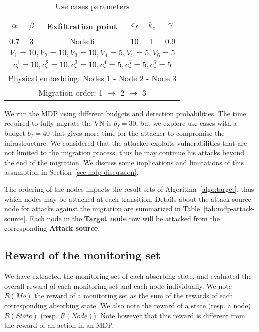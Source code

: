 \begin{table}[ht]
\centering
\begin{tabular}{|c|c|l|c|c|c|c|}
\hline
$\alpha$ & \multicolumn{2}{c|}{$\beta$} & Exfiltration point & $c_f$ & $k_c$ & $\gamma$ \\ \hline
0.7      & \multicolumn{2}{c|}{3}       & Node 6             & 10    & 1    & 0.9      \\ \hline
\multicolumn{7}{|c|}{$V_1=10,V_2=10,V_3=10,V_4=5,V_5=5,V_6=5$}                          \\ \hline
\multicolumn{7}{|c|}{$c_c^1=10,c_c^2=10,c_c^3=10,c_c^4=5,c_c^5=5,c_c^6=5$}                          \\ \hline
\multicolumn{7}{|c|}{Physical embedding: Nodes 1 - Node 2 - Node 3}                     \\ \hline
\multicolumn{7}{|c|}{Migration order: 1 $\rightarrow$ 2 $\rightarrow$ 3}                \\ \hline
\end{tabular}
\caption{Use cases parameters}
\label{tab:mdp-parameters}
\end{table}



We run the MDP using different budgets and detection probabilities.
The time required to fully migrate the VN is $b_f=30$, but we explore use cases with a budget $b_f=40$ that gives more time for the attacker to compromise the infrastructure. We considered that the attacker exploits vulnerabilities that are not limited to the migration process, thus he may continue his attacks beyond the end of the migration. We discuss some implications and limitations of this assumption in Section~\ref{sec:mdp-discussion}.

The ordering of the nodes impacts the result sets of Algorithm~\ref{algo:target}, thus which nodes may be attacked at each transition.
Details about the attack source node for attacks against the migration are summarized in Table~\ref{tab:mdp-attack-source}. Each node in the \textbf{Target node} row will be attacked from the corresponding \textbf{Attack source}.



\subsection{Reward of the monitoring set}
We have extracted the monitoring set of each absorbing state, and evaluated the overall reward of each monitoring set and each node individually.
We note $R(Mo)$ the reward of a monitoring set as the sum of the rewards of each corresponding absorbing state.
We also note the reward of a state (resp. a node) $R(State)$ (resp. $R(Node)$). Note however that this reward is different from the reward of an action in an MDP.

